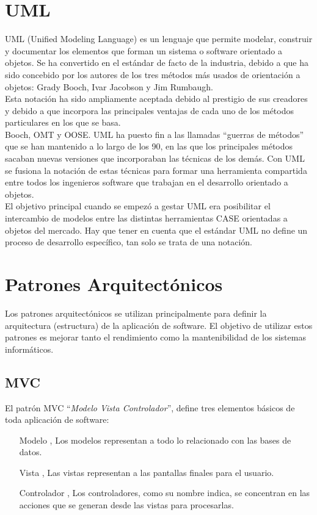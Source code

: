 \section{UML}
UML (Unified Modeling Language) es un lenguaje que permite modelar, construir y documentar los elementos que forman un sistema o software orientado a objetos. Se ha convertido en el est\'andar de facto de la industria, debido a que ha sido concebido por los autores de los tres m\'etodos m\'as usados de orientaci\'on a objetos: Grady Booch, Ivar Jacobson y Jim Rumbaugh.\\
Esta notaci\'on ha sido ampliamente aceptada debido al prestigio de sus creadores y debido a que incorpora las principales ventajas de cada uno de los m\'etodos particulares en los que se basa.\\
Booch, OMT y OOSE. UML ha puesto fin a las llamadas ``guerras de m\'etodos'' que se han mantenido a lo largo de los 90, en las que los principales m\'etodos sacaban nuevas versiones que incorporaban las t\'ecnicas de los dem\'as. Con UML se fusiona la notaci\'on de estas t\'ecnicas para formar una herramienta compartida entre todos los ingenieros software que trabajan en el desarrollo orientado a objetos.\\
El objetivo principal cuando se empez\'o a gestar UML era posibilitar el intercambio de modelos entre las distintas herramientas CASE orientadas a objetos del mercado. Hay que tener en cuenta que el est\'andar UML no define un proceso de desarrollo espec\'ifico, tan solo se trata de una notaci\'on. \cite{ing_soft}

\section{Patrones Arquitect\'onicos}
Los patrones arquitect\'onicos se utilizan principalmente para definir la arquitectura (estructura) de la aplicaci\'on de software. El objetivo de utilizar estos patrones es mejorar tanto el rendimiento como la mantenibilidad de los sistemas inform\'aticos\cite{design_patterns}.

\subsection{MVC}
El patr\'on MVC ``\emph{Modelo Vista Controlador}'', define tres elementos b\'asicos de toda aplicaci\'on de software:
\begin{itemize}
\item[Modelo], Los modelos representan a todo lo relacionado con las bases de datos.
\item[Vista], Las vistas representan a las pantallas finales para el usuario.
\item[Controlador], Los controladores, como su nombre indica, se concentran en las acciones que se generan desde las vistas para procesarlas.
\end{itemize}

